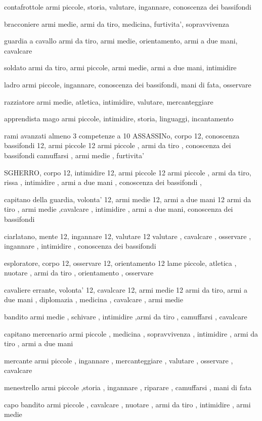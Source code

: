 \documentclass[12pt,a4paper,twoside,openany,twocolumn]{book}
\begin{document}
contafrottole
armi piccole, storia, valutare, ingannare, conoscenza dei bassifondi

bracconiere
armi medie, armi da tiro, medicina, furtivita', sopravvivenza

guardia a cavallo
armi da tiro, armi medie, orientamento, armi a due mani, cavalcare

soldato
armi da tiro, armi piccole, armi medie, armi a due mani, intimidire

ladro
armi piccole, ingannare, conoscenza dei bassifondi, mani di fata, osservare

razziatore
armi medie, atletica, intimidire, valutare,  mercanteggiare

apprendista mago
armi piccole, intimidire,  storia, linguaggi, incantamento


rami avanzati almeno 3 competenze a 10
ASSASSINo, corpo 12, conoscenza bassifondi 12, armi piccole 12
armi piccole , armi da tiro , conoscenza dei bassifondi  camuffarsi , armi medie , furtivita' 

SGHERRO, corpo 12, intimidire 12, armi piccole 12
armi piccole , armi da tiro, rissa , intimidire , armi a due mani , conoscenza dei bassifondi ,

capitano della guardia, volonta' 12, armi medie 12, armi a due mani 12
armi da tiro , armi medie ,cavalcare , intimidire , armi a due mani, conoscenza dei bassifondi 

ciarlatano, mente 12, ingannare 12, valutare 12
valutare , cavalcare , osservare , ingannare , intimidire , conoscenza dei bassifondi 

esploratore, corpo 12, osservare 12, orientamento 12
lame piccole, atletica ,  nuotare , armi da tiro , orientamento , osservare 

cavaliere errante, volonta' 12, cavalcare 12, armi medie 12
armi da tiro, armi a due mani , diplomazia , medicina , cavalcare , armi medie 

bandito
armi medie , schivare , intimidire ,armi da tiro  , camuffarsi , cavalcare 

capitano mercenario
armi piccole , medicina , sopravvivenza , intimidire , armi da tiro , armi a due mani 

mercante
armi piccole , ingannare , mercanteggiare , valutare , osservare , cavalcare 

menestrello
armi piccole ,storia , ingannare , riparare , camuffarsi ,  mani di fata 

capo bandito
armi piccole , cavalcare , nuotare , armi da tiro , intimidire , armi medie 
\end{document}
